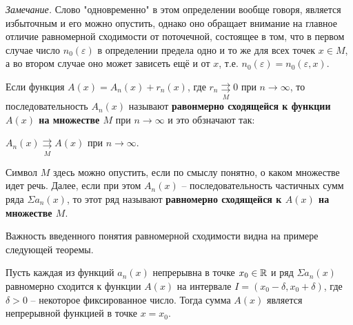 \textit{Замечание.} Слово "одновременно" в этом определении вообще говоря, является избыточным и его можно опустить, однако оно обращает внимание на главное отличие равномерной сходимости от поточечной, состоящее в том, что в первом случае число $n_0(\varepsilon)$ в определении предела одно и то же для всех точек $x \in M$, а во втором случае оно может зависеть ещё и от $x$, т.е. $n_0(\varepsilon)=n_0(\varepsilon,x)$.\smallskip
\begin{object} Если функция $A(x)=A_n(x)+r_n(x)$, где $r_n\mathop{\rightrightarrows}\limits_{M} 0$ при $n\rightarrow \infty$, то последовательность $A_n(x)$ называют \textbf{равонмерно сходящейся к функции $A(x)$ на множестве $M$} при $n\rightarrow \infty$ и это обзначают так:
\begin{center}$A_n(x)\mathop{\rightrightarrows}\limits_{M} A(x)$ при $n\rightarrow \infty$.\end{center}\smallskip

Символ $M$ здесь можно опустить, если по смыслу понятно, о каком множестве идет речь. Далее, если при этом $A_n(x)$ -- последовательность частичных сумм ряда $\Sigma a_n(x)$, то этот ряд называют \textbf{равномерно сходящейся к $A(x)$ на множестве $M$}.\end{object}

Важность введенного понятия равномерной сходимости видна на примере следующей теоремы.\smallskip


\begin{theorem} Пусть каждая из функций $a_n(x)$ непрерывна в точке $x_0 \in \mathbb R$ и ряд $\Sigma a_n(x)$ равномерно сходится к функции $A(x)$ на интервале $I=(x_0-\delta,x_0+\delta)$, где $\delta>0$ -- некоторое фиксированное число. Тогда сумма $A(x)$ является непрерывной функцией в точке $x=x_0$.\end{theorem}

